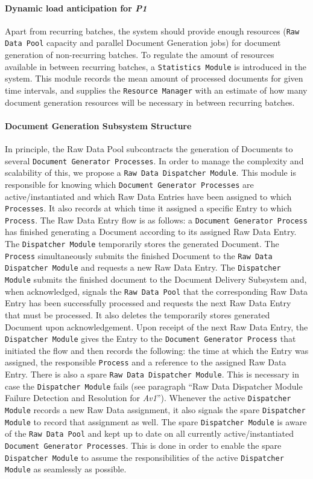 \documentclass[a4paper,10pt]{article}
\begin{document}
\paragraph{Dynamic load anticipation for \emph{P1}}
Apart from recurring batches, the system should provide enough resources (\texttt{Raw Data Pool} capacity and parallel Document Generation jobs) for document generation of non-recurring batches. To regulate the amount of resources available in between recurring batches, a \texttt{Statistics Module} is introduced in the system. This module records the mean amount of processed documents for given time intervals, and supplies the \texttt{Resource Manager} with an estimate of how many document generation resources will be necessary in between recurring batches.

\paragraph{Document Generation Subsystem Structure}
In principle, the Raw Data Pool subcontracts the generation of Documents to several \texttt{Document Generator Processes}. In order to manage the complexity and scalability of this, we propose a \texttt{Raw Data Dispatcher Module}. This module is responsible for knowing which \texttt{Document Generator Processes} are active/instantiated and which Raw Data Entries have been assigned to which \texttt{Processes}. It also records at which time it assigned a specific Entry to which \texttt{Process}. The Raw Data Entry flow is as follows: a \texttt{Document Generator Process} has finished generating a Document according to its assigned Raw Data Entry. The \texttt{Dispatcher Module} temporarily stores the generated Document. The \texttt{Process} simultaneously submits the finished Document to the \texttt{Raw Data Dispatcher Module} and requests a new Raw Data Entry. The \texttt{Dispatcher Module} submits the finished document to the Document Delivery Subsystem and, when acknowledged, signals the \texttt{Raw Data Pool} that the corresponding Raw Data Entry has been successfully processed and requests the next Raw Data Entry that must be processed. It also deletes the temporarily stores generated Document upon acknowledgement. Upon receipt of the next Raw Data Entry, the \texttt{Dispatcher Module} gives the Entry to the \texttt{Document Generator Process} that initiated the flow and then records the following: the time at which the Entry was assigned, the responsible \texttt{Process} and a reference to the assigned Raw Data Entry. There is also a spare \texttt{Raw Data Dispatcher Module}. This is necessary in case the \texttt{Dispatcher Module} fails (see paragraph ``Raw Data Dispatcher Module Failure Detection and Resolution for \emph{Av1}''). Whenever the active \texttt{Dispatcher Module} records a new Raw Data assignment, it also signals the spare \texttt{Dispatcher Module} to record that assignment as well. The spare \texttt{Dispatcher Module} is aware of the \texttt{Raw Data Pool} and kept up to date on all currently active/instantiated \texttt{Document Generator Processes}. This is done in order to enable the spare \texttt{Dispatcher Module} to assume the responsibilities of the active \texttt{Dispatcher Module} as seamlessly as possible.
\end{document}

